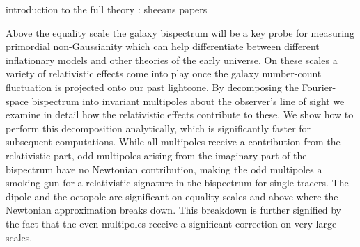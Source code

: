 
introduction to the full theory : sheeans papers

Above the equality scale the galaxy bispectrum will be  a key probe for measuring primordial non-Gaussianity which can help differentiate between different inflationary models and other theories of the early universe. On these scales a variety of relativistic effects come into play once the galaxy number-count fluctuation is projected onto our past lightcone. By decomposing the Fourier-space bispectrum into invariant multipoles about the observer's line of sight we examine in detail how the relativistic effects contribute to these. We show how to perform this decomposition analytically, which is significantly faster for subsequent computations.  While all multipoles receive a contribution from the relativistic part, odd multipoles arising from the imaginary part of the bispectrum have no Newtonian contribution, making the odd multipoles a smoking gun for a relativistic signature in the bispectrum for single tracers.  The dipole and the octopole are significant on equality scales and above where the Newtonian approximation breaks down. This breakdown is further signified by the fact that the even multipoles receive a significant correction on very large scales.

